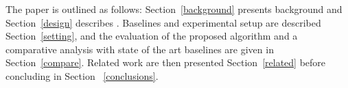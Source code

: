 
The paper is outlined as follows: Section~\ref{background} presents background and Section~\ref{design} describes \method\hspace{0.02in}.
Baselines and experimental setup are described Section~\ref{setting}, and the evaluation of the proposed algorithm and a comparative analysis with state of the art baselines are given in Section~\ref{compare}. Related work are then presented Section~\ref{related} before concluding in Section ~\ref{conclusions}.









